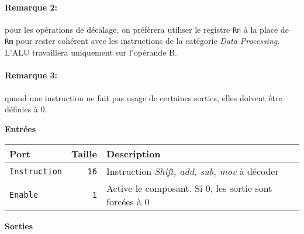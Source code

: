 \paragraph{Remarque 2:} pour les opérations de décalage, on préfèrera utiliser le registre \texttt{Rn} à la place de \texttt{Rm} pour rester cohérent avec les instructions de la catégorie \textit{Data Processing}. L'ALU travaillera uniquement sur l'opérande B.

\paragraph{Remarque 3:} quand une instruction ne fait pas usage de certaines sorties, elles doivent être définies à 0.



\textbf{Entrées}\\

\begin{tabular}{|l|r|l|}
\hline
\textbf{Port}		& \textbf{Taille} & \textbf{Description}\\
\hline

\texttt{Instruction}	& \texttt{16} & Instruction \textit{Shift, add, sub, mov} à décoder\\
\hline
\texttt{Enable}		&  \texttt{1} & Active le composant. Si 0, les sortie sont forcées à 0\\


\hline
\end{tabular}

\vspace{1em}
\textbf{Sorties}\\

